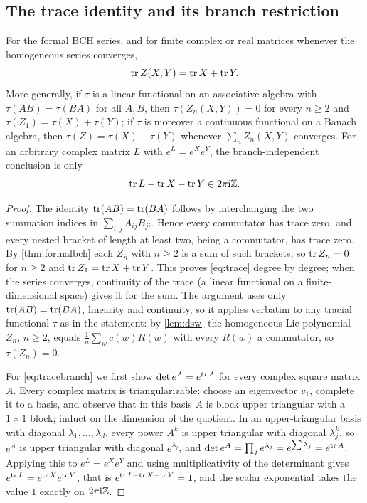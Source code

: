 \subsection{The trace identity and its branch restriction}
\begin{proposition}\label{prop:trace}
For the formal BCH series, and for finite complex or real matrices whenever
the homogeneous series converges,
\begin{equation}\label{eq:trace}
 \operatorname{tr} Z(X,Y)=\operatorname{tr} X+\operatorname{tr} Y.
\end{equation}
More generally, if $\tau$ is a linear functional on an associative algebra
with $\tau(AB)=\tau(BA)$ for all $A,B$, then $\tau(Z_n(X,Y))=0$ for every
$n\geq2$ and $\tau(Z_1)=\tau(X)+\tau(Y)$; if $\tau$ is moreover a continuous
functional on a Banach algebra, then $\tau(Z)=\tau(X)+\tau(Y)$ whenever
$\sum_nZ_n(X,Y)$ converges.
For an arbitrary complex matrix $L$ with $e^L=e^Xe^Y$, the branch-independent
conclusion is only
\begin{equation}\label{eq:tracebranch}
 \operatorname{tr} L-\operatorname{tr} X-\operatorname{tr} Y\in2\pi\mathrm{i}\mathbb{Z}.
\end{equation}
\end{proposition}
\begin{proof}
The identity $\operatorname{tr}(AB)=\operatorname{tr}(BA)$ follows by interchanging the two summation
indices in $\sum_{i,j}A_{ij}B_{ji}$. Hence every commutator has trace zero,
and every nested bracket of length at least two, being a commutator, has
trace zero. By \cref{thm:formalbch} each $Z_n$ with $n\geq2$ is a sum of
such brackets, so $\operatorname{tr} Z_n=0$ for $n\geq2$ and $\operatorname{tr} Z_1=\operatorname{tr} X+\operatorname{tr} Y$. This
proves \eqref{eq:trace} degree by degree; when the series converges,
continuity of the trace (a linear functional on a finite-dimensional space)
gives it for the sum. The argument uses only $\operatorname{tr}(AB)=\operatorname{tr}(BA)$, linearity
and continuity, so it applies verbatim to any tracial functional $\tau$ as
in the statement: by \cref{lem:dsw} the homogeneous Lie polynomial $Z_n$,
$n\geq2$, equals $\frac1n\sum_wc(w)R(w)$ with every $R(w)$ a commutator, so
$\tau(Z_n)=0$.

For \eqref{eq:tracebranch} we first show $\det e^A=e^{\operatorname{tr} A}$ for every
complex square matrix $A$. Every complex matrix is triangularizable: choose
an eigenvector $v_1$, complete it to a basis, and observe that in this basis
$A$ is block upper triangular with a $1\times1$ block; induct on the
dimension of the quotient. In an upper-triangular basis with diagonal
$\lambda_1,\ldots,\lambda_d$, every power $A^k$ is upper triangular with
diagonal $\lambda_j^k$, so $e^A$ is upper triangular with diagonal
$e^{\lambda_j}$, and $\det e^A=\prod_je^{\lambda_j}=e^{\sum\lambda_j}
=e^{\operatorname{tr} A}$. Applying this to $e^L=e^Xe^Y$ and using multiplicativity of
the determinant gives $e^{\operatorname{tr} L}=e^{\operatorname{tr} X}e^{\operatorname{tr} Y}$, that is
$e^{\operatorname{tr} L-\operatorname{tr} X-\operatorname{tr} Y}=1$, and the scalar exponential takes the value $1$
exactly on $2\pi\mathrm{i}\mathbb{Z}$.
\end{proof}
